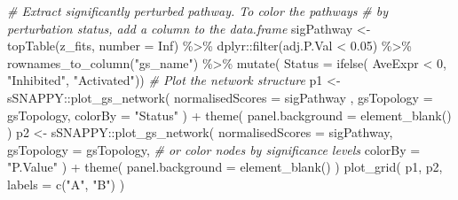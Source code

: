 \documentclass[9pt,a4paper,]{extarticle}
\newenvironment{Shaded}{\begin{snugshade}}{\end{snugshade}}
\newcommand{\AttributeTok}[1]{\textcolor[rgb]{0.77,0.63,0.00}{#1}}
\newcommand{\CommentTok}[1]{\textcolor[rgb]{0.56,0.35,0.01}{\textit{#1}}}
\newcommand{\ConstantTok}[1]{\textcolor[rgb]{0.00,0.00,0.00}{#1}}
\newcommand{\DecValTok}[1]{\textcolor[rgb]{0.00,0.00,0.81}{#1}}
\newcommand{\FloatTok}[1]{\textcolor[rgb]{0.00,0.00,0.81}{#1}}
\newcommand{\FunctionTok}[1]{\textcolor[rgb]{0.00,0.00,0.00}{#1}}
\newcommand{\NormalTok}[1]{#1}
\newcommand{\OtherTok}[1]{\textcolor[rgb]{0.56,0.35,0.01}{#1}}
\newcommand{\SpecialCharTok}[1]{\textcolor[rgb]{0.00,0.00,0.00}{#1}}
\newcommand{\StringTok}[1]{\textcolor[rgb]{0.31,0.60,0.02}{#1}}
\begin{document}
\begin{Shaded}
\begin{Highlighting}[]
\CommentTok{\# Extract significantly perturbed pathway. To color the pathways}
\CommentTok{\# by perturbation status, add a column to the data.frame}
\NormalTok{sigPathway }\OtherTok{\textless{}{-}} \FunctionTok{topTable}\NormalTok{(z\_fits, }\AttributeTok{number =} \ConstantTok{Inf}\NormalTok{) }\SpecialCharTok{\%\textgreater{}\%} 
\NormalTok{    dplyr}\SpecialCharTok{::}\FunctionTok{filter}\NormalTok{(adj.P.Val }\SpecialCharTok{\textless{}} \FloatTok{0.05}\NormalTok{) }\SpecialCharTok{\%\textgreater{}\%}
    \FunctionTok{rownames\_to\_column}\NormalTok{(}\StringTok{"gs\_name"}\NormalTok{) }\SpecialCharTok{\%\textgreater{}\%}
    \FunctionTok{mutate}\NormalTok{(}
        \AttributeTok{Status =} \FunctionTok{ifelse}\NormalTok{(}
\NormalTok{            AveExpr }\SpecialCharTok{\textless{}} \DecValTok{0}\NormalTok{, }\StringTok{"Inhibited"}\NormalTok{, }\StringTok{"Activated"}\NormalTok{))}
\CommentTok{\# Plot the network structure}
\NormalTok{p1 }\OtherTok{\textless{}{-}}\NormalTok{ sSNAPPY}\SpecialCharTok{::}\FunctionTok{plot\_gs\_network}\NormalTok{(}
    \AttributeTok{normalisedScores =}\NormalTok{ sigPathway ,}
    \AttributeTok{gsTopology =}\NormalTok{ gsTopology, }
    \AttributeTok{colorBy =} \StringTok{"Status"}
\NormalTok{) }\SpecialCharTok{+}
    \FunctionTok{theme}\NormalTok{(}
        \AttributeTok{panel.background =} \FunctionTok{element\_blank}\NormalTok{()}
\NormalTok{    )}
\NormalTok{p2 }\OtherTok{\textless{}{-}}\NormalTok{ sSNAPPY}\SpecialCharTok{::}\FunctionTok{plot\_gs\_network}\NormalTok{(}
    \AttributeTok{normalisedScores =}\NormalTok{ sigPathway,}
    \AttributeTok{gsTopology =}\NormalTok{ gsTopology, }
    \CommentTok{\# or color nodes by significance levels}
    \AttributeTok{colorBy  =} \StringTok{"P.Value"}
\NormalTok{) }\SpecialCharTok{+}
    \FunctionTok{theme}\NormalTok{(}
        \AttributeTok{panel.background =} \FunctionTok{element\_blank}\NormalTok{()}
\NormalTok{    )}
\FunctionTok{plot\_grid}\NormalTok{(}
\NormalTok{    p1, p2, }
    \AttributeTok{labels =} \FunctionTok{c}\NormalTok{(}\StringTok{"A"}\NormalTok{, }\StringTok{"B"}\NormalTok{)}
\NormalTok{)}
\end{Highlighting}
\end{Shaded}
\end{document}
